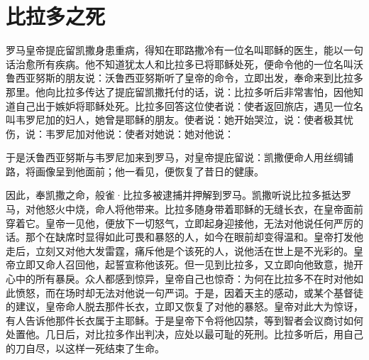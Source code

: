 
\chapter{比拉多之死}


罗马皇帝提庇留凯撒身患重病，得知在耶路撒冷有一位名叫耶稣的医生，能以一句话治愈所有疾病。他不知道犹太人和比拉多已将耶稣处死，便命令他的一位名叫沃鲁西亚努斯的朋友说：沃鲁西亚努斯听了皇帝的命令，立即出发，奉命来到比拉多那里。他向比拉多传达了提庇留凯撒托付的话，说：比拉多听后非常害怕，因他知道自己出于嫉妒将耶稣处死。比拉多回答这位使者说：使者返回旅店，遇见一位名叫韦罗尼加的妇人，她曾是耶稣的朋友。使者说：她开始哭泣，说：使者极其忧伤，说：韦罗尼加对他说：使者对她说：她对他说：\par

于是沃鲁西亚努斯与韦罗尼加来到罗马，对皇帝提庇留说：凯撒便命人用丝绸铺路，将画像呈到他面前；他一看见，便恢复了昔日的健康。\par

因此，奉凯撒之命，般雀·比拉多被逮捕并押解到罗马。凯撒听说比拉多抵达罗马，对他怒火中烧，命人将他带来。比拉多随身带着耶稣的无缝长衣，在皇帝面前穿着它。皇帝一见他，便放下一切怒气，立即起身迎接他，无法对他说任何严厉的话。那个在缺席时显得如此可畏和暴怒的人，如今在眼前却变得温和。皇帝打发他走后，立刻又对他大发雷霆，痛斥他是个该死的人，说他活在世上是不光彩的。皇帝立即又命人召回他，起誓宣称他该死。但一见到比拉多，又立即向他致意，抛开心中的所有暴戾。众人都感到惊异，皇帝自己也惊奇：为何在比拉多不在时对他如此愤怒，而在场时却无法对他说一句严词。于是，因着天主的感动，或某个基督徒的建议，皇帝命人脱去那件长衣，立即又恢复了对他的暴怒。皇帝对此大为惊讶，有人告诉他那件长衣属于主耶稣。于是皇帝下令将他囚禁，等到智者会议商讨如何处置他。几日后，对比拉多作出判决，应处以最可耻的死刑。比拉多听后，用自己的刀自尽，以这样一死结束了生命。\par

